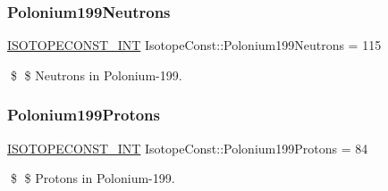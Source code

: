\subsubsection{\texorpdfstring{Polonium199\+Neutrons}{Polonium199Neutrons}}
{\footnotesize\ttfamily \mbox{\hyperlink{group___isotope_const-_macros_ga5f18360b3e99483a35c32d789e62621c}{I\+S\+O\+T\+O\+P\+E\+C\+O\+N\+S\+T\+\_\+\+I\+NT}} Isotope\+Const\+::\+Polonium199\+Neutrons = 115}

\$ \$ Neutrons in Polonium-\/199. \mbox{\label{group___isotope_const-_polonium-_po199_ga9b19a5d563b4119f43865f87d9b7628a}} 
\subsubsection{\texorpdfstring{Polonium199\+Protons}{Polonium199Protons}}
{\footnotesize\ttfamily \mbox{\hyperlink{group___isotope_const-_macros_ga5f18360b3e99483a35c32d789e62621c}{I\+S\+O\+T\+O\+P\+E\+C\+O\+N\+S\+T\+\_\+\+I\+NT}} Isotope\+Const\+::\+Polonium199\+Protons = 84}

\$ \$ Protons in Polonium-\/199. 